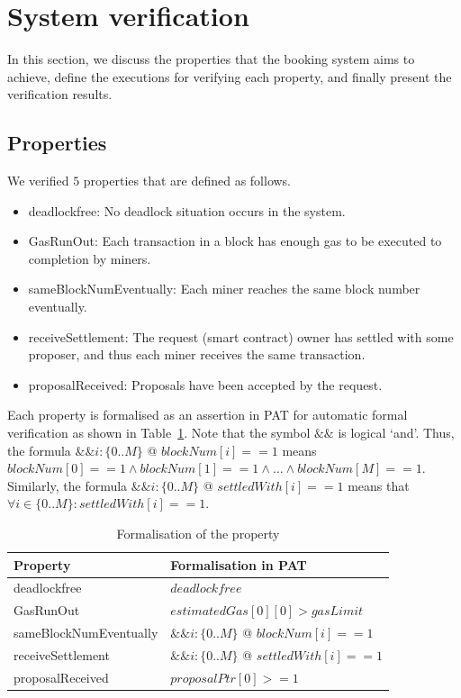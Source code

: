 \documentclass{KERauth}
\begin{document}
\section{System verification}

In this section, we discuss the properties that the booking system aims to achieve, define the executions for verifying each property, and finally present the verification results. 

\subsection{Properties}
We verified $5$ properties that are defined as follows.
\begin{itemize}
    \item deadlockfree: No deadlock situation occurs in the
system.
\item GasRunOut: Each transaction in a block has
enough gas to be executed to completion by miners.
\item sameBlockNumEventually: Each miner reaches the same block
number eventually.
\item receiveSettlement: The request (smart contract) owner has settled with
some proposer, and thus each miner
receives the same transaction.
\item proposalReceived: Proposals have been accepted by the
request.
\end{itemize}
Each property is formalised as an assertion in PAT for automatic formal verification as shown in Table~\ref{tab:property}. Note that the symbol $\&\&$ is logical `and'. Thus, the formula $\&\& i:\{0..M\}$ @ $blockNum[i]==1$ means $blockNum[0]==1 \land blockNum[1]==1 \land \ldots \land blockNum[M]==1$. Similarly, the formula $\&\& i: \{0..M\}$ @ $settledWith[i] == 1$ means that $\forall i\in \{0..M\}: settledWith[i] == 1$.

\begin{table}[!h]
    \centering
    \begin{tabular}{|l|l|}
    \hline
         {\bf Property} &  {\bf Formalisation in PAT}   \\
         \hline
        deadlockfree &  $deadlockfree$\\
        \hline
        GasRunOut& $estimatedGas[0][0] > gasLimit$\\
        \hline
        sameBlockNumEventually & $\&\& i:\{0..M\}$ @ $blockNum[i] == 1$\\
        \hline
        receiveSettlement & $\&\& i: \{0..M\}$ @ $settledWith[i] == 1$\\
        \hline
        proposalReceived & $proposalPtr[0] >= 1$\\
        \hline
    \end{tabular}
    \caption{Formalisation of the property}
    \label{tab:property}
\end{table}
\end{document}
